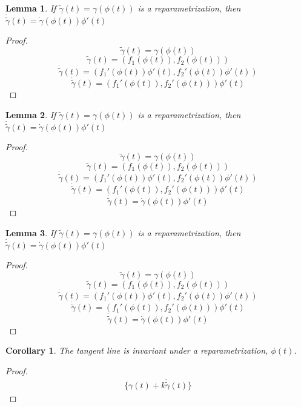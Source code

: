 \documentclass[twocolumn,20pt,fleqn]{extarticle}
\theoremstyle{plain}
\newtheorem*{lemma}{Lemma}
\newtheorem*{corollary}{Corollary}
\theoremstyle{definition}
\theoremstyle{remark}
\begin{document}
\begin{lemma}
If $\tilde{\gamma}(t) = \gamma(\phi(t))$ is a reparametrization, then $\dot{\tilde{\gamma}}(t) = \dot{\gamma}(\phi(t))\phi'(t)$
\end{lemma}
\begin{proof}
\[\tilde{\gamma}(t) = \gamma(\phi(t))\]
\[\tilde{\gamma}(t) = (f_1(\phi(t)), f_2(\phi(t)))\]
\[\dot{\tilde{\gamma}}(t) = (f_1'(\phi(t))\phi'(t), f_2'(\phi(t))\phi'(t))\]
\[\dot{\tilde{\gamma}}(t) = (f_1'(\phi(t)), f_2'(\phi(t)))\phi'(t)\]\end{proof}


\clearpage



\begin{lemma}
If $\tilde{\gamma}(t) = \gamma(\phi(t))$ is a reparametrization, then $\dot{\tilde{\gamma}}(t) = \dot{\gamma}(\phi(t))\phi'(t)$
\end{lemma}
\begin{proof}
\[\tilde{\gamma}(t) = \gamma(\phi(t))\]
\[\tilde{\gamma}(t) = (f_1(\phi(t)), f_2(\phi(t)))\]
\[\dot{\tilde{\gamma}}(t) = (f_1'(\phi(t))\phi'(t), f_2'(\phi(t))\phi'(t))\]
\[\dot{\tilde{\gamma}}(t) = (f_1'(\phi(t)), f_2'(\phi(t)))\phi'(t)\]
\[\dot{\tilde{\gamma}}(t) = \dot{\gamma}(\phi(t))\phi'(t)\]\end{proof}


\clearpage



\begin{lemma}
If $\tilde{\gamma}(t) = \gamma(\phi(t))$ is a reparametrization, then $\dot{\tilde{\gamma}}(t) = \dot{\gamma}(\phi(t))\phi'(t)$
\end{lemma}
\begin{proof}
\[\tilde{\gamma}(t) = \gamma(\phi(t))\]
\[\tilde{\gamma}(t) = (f_1(\phi(t)), f_2(\phi(t)))\]
\[\dot{\tilde{\gamma}}(t) = (f_1'(\phi(t))\phi'(t), f_2'(\phi(t))\phi'(t))\]
\[\dot{\tilde{\gamma}}(t) = (f_1'(\phi(t)), f_2'(\phi(t)))\phi'(t)\]
\[\dot{\tilde{\gamma}}(t) = \dot{\gamma}(\phi(t))\phi'(t)\]
\end{proof}

\begin{corollary}
The tangent line is invariant under a reparametrization, $\phi(t)$.
\end{corollary}
\begin{proof}
\begin{eqnarray*}
\{\gamma(t) + k\dot{\tilde{\gamma}}(t) \}\end{eqnarray*}\end{proof}
\end{document}
